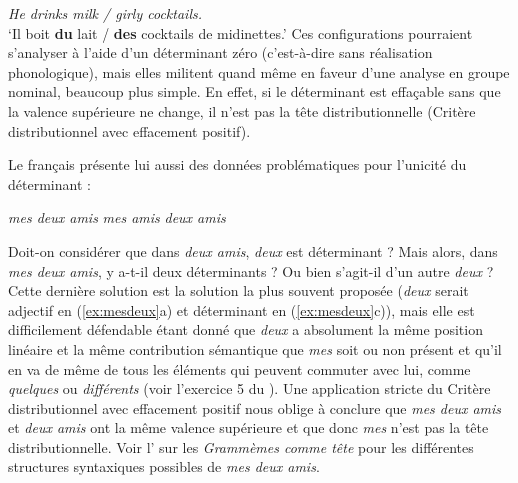 \ea
\textit{{He drinks milk / girly cocktails.}}\\
\glt ‘Il boit \textbf{du} lait / \textbf{des} cocktails de midinettes.’
\z
Ces configurations pourraient s’analyser à l’aide d’un déterminant zéro (c’est-à-dire sans réalisation phonologique), mais elles militent quand même en faveur d’une analyse en groupe nominal, beaucoup plus simple. En effet, si le déterminant est effaçable sans que la valence supérieure ne change, il n’est pas la tête distributionnelle (Critère distributionnel avec effacement positif).

Le français présente lui aussi des données problématiques pour l’unicité du déterminant :

\ea\label{ex:mesdeux}
  \ea \textit{mes deux amis}
  \ex \textit{mes amis}
  \ex \textit{deux amis}
  \z
\z

Doit-on considérer que dans \textit{deux amis}, \textit{deux} est déterminant ? Mais alors, dans \textit{mes deux amis}, y a-t-il deux déterminants ? Ou bien s’agit-il d’un autre \textit{deux} ? Cette dernière solution est la solution la plus souvent proposée (\textit{deux} serait adjectif en (\ref{ex:mesdeux}a) et déterminant en (\ref{ex:mesdeux}c)), mais elle est difficilement défendable étant donné que \textit{deux} a absolument la même position linéaire et la même contribution sémantique que \textit{mes} soit ou non présent et qu’il en va de même de tous les éléments qui peuvent commuter avec lui, comme \textit{quelques} ou \textit{différents} (voir l’exercice 5 du ). Une application stricte du Critère distributionnel avec effacement positif nous oblige à conclure que \textit{mes deux amis} et \textit{deux amis} ont la même valence supérieure et que donc \textit{mes} n’est pas la tête distributionnelle. Voir l’ sur les \textit{Grammèmes comme tête} pour les différentes structures syntaxiques possibles de \textit{mes deux amis}.

